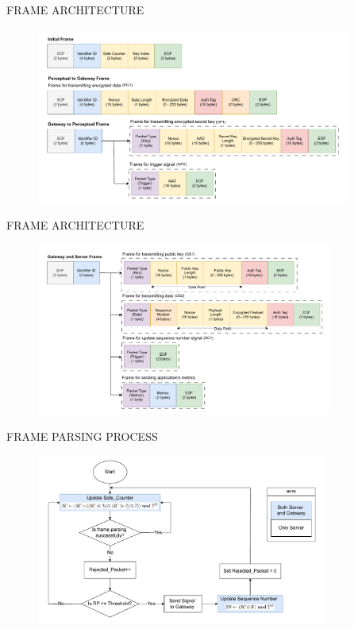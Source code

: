 \begin{frame}{FRAME ARCHITECTURE}
    \vspace{-0.32cm}
    \begin{figure}
    	\centering
    	\includegraphics[width=0.92\textwidth]{pic/frame1.pdf}
    \end{figure}
\end{frame}

\begin{frame}{FRAME ARCHITECTURE}
    \vspace{-0.3cm}
    \begin{figure}
    	\centering
    	\includegraphics[width=0.87\textwidth]{pic/frame2.pdf}
    \end{figure}
\end{frame}

\begin{frame}{FRAME PARSING PROCESS}
\vspace{-0.3cm}
    \begin{figure}
    	\centering
    	\includegraphics[width=0.85\textwidth]{pic/sc.pdf}
    \end{figure}
\end{frame}

